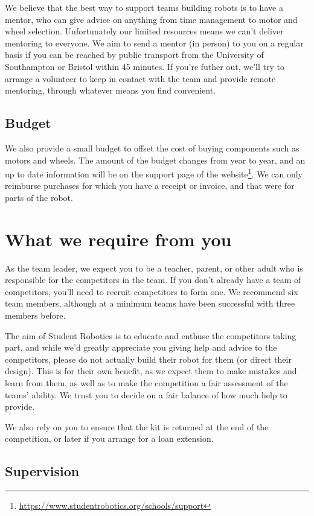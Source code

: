 \documentclass[a4paper]{article}
\begin{document}
We believe that the best way to support teams building robots is to have a
mentor, who can give advice on anything from time management to motor and wheel
selection. Unfortunately our limited resources means we can't deliver mentoring
to everyone. We aim to send a mentor (in person) to you on a regular basis if
you can be reached by public transport from the University of Southampton or
Bristol within 45 minutes. If you're futher out, we'll try to arrange a
volunteer to keep in contact with the team and provide remote mentoring,
through whatever means you find convenient.

\subsection*{Budget}

We also provide a small budget to offset the cost of buying components such as
motors and wheels. The amount of the budget changes from year to year, and an
up to date information will be on the support page of the
website\footnote{\url{https://www.studentrobotics.org/schools/support}}. We
can only reimburse purchases for which you have a receipt or invoice, and that
were for parts of the robot.

\section*{What we require from you}

As the team leader, we expect you to be a teacher, parent, or other adult who
is responsible for the competitors in the team. If you don't already have a
team of competitors, you'll need to recruit competitors to form one. We
recommend six team members, although at a minimum teams have been successful
with three members before.

The aim of Student Robotics is to educate and enthuse the competitors taking
part, and while we'd greatly appreciate you giving help and advice to the
competitors, please do not actually build their robot for them (or direct their
design). This is for their own benefit, as we expect them to make mistakes and
learn from them, as well as to make the competition a fair assessment of the
teams' ability. We trust you to decide on a fair balance of how much help to
provide.

We also rely on you to ensure that the kit is returned at the end of the
competition, or later if you arrange for a loan extension.

\subsection*{Supervision}
\end{document}
